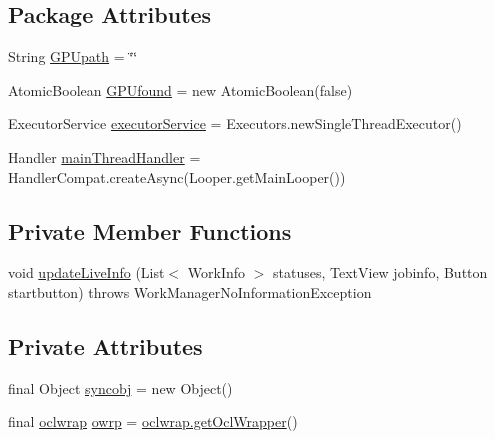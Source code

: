 \subsection*{Package Attributes}
\begin{DoxyCompactItemize}
\item 
String \mbox{\hyperlink{classcom_1_1example_1_1dmocl_1_1MainActivity_aade6435b69c9fe19247a61b67a8bc6c4}{G\+P\+Upath}} = \char`\"{}\char`\"{}
\item 
Atomic\+Boolean \mbox{\hyperlink{classcom_1_1example_1_1dmocl_1_1MainActivity_a202e63994768ec6b848cc5ea8d0bc7fa}{G\+P\+Ufound}} = new Atomic\+Boolean(false)
\item 
Executor\+Service \mbox{\hyperlink{classcom_1_1example_1_1dmocl_1_1MainActivity_a3cb13ff3b6a5bb8274a82b5e5531babc}{executor\+Service}} = Executors.\+new\+Single\+Thread\+Executor()
\item 
Handler \mbox{\hyperlink{classcom_1_1example_1_1dmocl_1_1MainActivity_a1ee4246708662ea604b9c5485f37daa6}{main\+Thread\+Handler}} = Handler\+Compat.\+create\+Async(Looper.\+get\+Main\+Looper())
\end{DoxyCompactItemize}
\subsection*{Private Member Functions}
\begin{DoxyCompactItemize}
\item 
void \mbox{\hyperlink{classcom_1_1example_1_1dmocl_1_1MainActivity_a68c83a580a869fcaed554bee7fccfef4}{update\+Live\+Info}} (List$<$ Work\+Info $>$ statuses, Text\+View jobinfo, Button startbutton)  throws Work\+Manager\+No\+Information\+Exception 
\end{DoxyCompactItemize}
\subsection*{Private Attributes}
\begin{DoxyCompactItemize}
\item 
final Object \mbox{\hyperlink{classcom_1_1example_1_1dmocl_1_1MainActivity_aab1bd415da3d75e0223a77caa941333d}{syncobj}} = new Object()
\item 
final \mbox{\hyperlink{classcom_1_1example_1_1dmocl_1_1oclwrap}{oclwrap}} \mbox{\hyperlink{classcom_1_1example_1_1dmocl_1_1MainActivity_ac96a1197ded8a7cf0cb4ea39d37af6a6}{owrp}} = \mbox{\hyperlink{classcom_1_1example_1_1dmocl_1_1oclwrap_a8c8c9a75d3d834cb71725d92ddeb4af7}{oclwrap.\+get\+Ocl\+Wrapper}}()
\end{DoxyCompactItemize}



